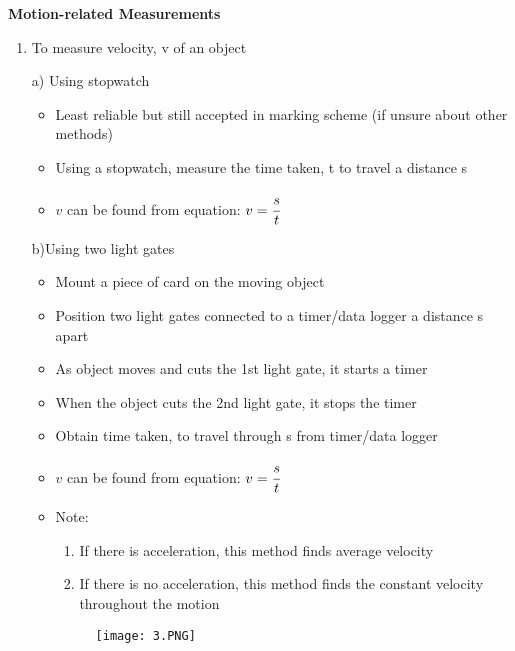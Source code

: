 \documentclass{article}
\begin{document}
\begin{flushleft}
\textbf{Motion-related Measurements}
\end{flushleft}
\begin{enumerate}
    \item To measure velocity, v of an object
    \begin{flushleft}
    a) Using stopwatch
    \end{flushleft}
    \begin{itemize}
        \item Least reliable but still accepted in marking scheme (if unsure about other methods)
\item Using a stopwatch, measure the time taken, t to travel a distance s
\item  $v$ can be found from equation: $v=\cfrac{s}{t}$
    \end{itemize}
    
    \begin{flushleft}
    b)Using two light gates
    \end{flushleft}
    \begin{itemize}
        \item Mount a piece of card on the moving object
\item  Position two light gates connected to a timer/data logger a distance s apart
\item As object moves and cuts the 1st light gate, it starts a timer
\item When the object cuts the 2nd light gate, it stops the timer
\item Obtain time taken, to travel through s from timer/data logger
\item $v$ can be found from equation: $v=\cfrac{s}{t}$
\item Note: 
    \begin{enumerate}
        \item If there is acceleration, this method finds average velocity
        \item If there is no acceleration, this method finds the constant velocity
throughout the motion
    \end{enumerate}
\begin{figure}[H]
    \centering
    \texttt{[image: 3.PNG]}
\end{figure}
    \end{itemize}
    

\end{enumerate}
\end{document}
